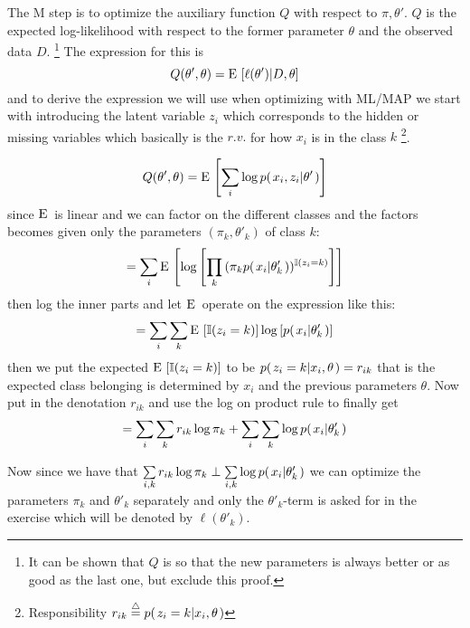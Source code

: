 \documentclass[a4paper,twoside=false,abstract=false,numbers=noenddot,
titlepage=false,headings=small,parskip=half,version=last]{scrartcl}
\begin{document}
\begin{solution}
    The M step is to optimize the auxiliary function $Q$ with respect to
    $\pi,\theta'$. $Q$ is the expected log-likelihood with respect to the former
    parameter $\theta$ and the observed data $D$. 
    \footnote{It can be shown that $Q$ is so that the new parameters is always
    better or as good as the last one, but exclude this proof.}
    The expression for this is
    \begin{equation}
        Q(\theta', \theta) = {\rm E}\,\left[\ell(\theta')|D,\theta\right]
    \end{equation}
    and to derive the expression we will use when optimizing with ML/MAP we start
    with introducing the latent variable $z_i$ which corresponds to the
    hidden or missing
    variables which basically is the $r.v.$ for how $x_i$
    is in the class $k$ \footnote{Responsibility $r_{ik}\eqdef
    \cprob{z_i=k}{x_i,\theta}$}.
    
    \begin{equation}
       Q(\theta', \theta) = 
       {\rm E}\,\left[\sum\limits_i\log p{(\left. x_i,z_i \middle\vert \theta' \right.)}\right] 
    \end{equation}
    since ${\rm E}\,$ is linear and we can factor on the different classes and
    the factors becomes given only the parameters $(\pi_k,\theta'_k)$ of class $k$:
    \begin{equation}
       =\sum\limits_i{\rm E}\, \left[ 
            \log\left[
                \prod\limits_k{(
                    \pi_kp{(\left. x_i \middle\vert \theta'_k \right.)}
                )^{\mathbb{I}(z_i=k)}} 
            \right]
        \right] 
    \end{equation}
    then log the inner parts and let ${\rm E}\,$ operate on the expression like
    this:
    \begin{equation}
        =\sum\limits_i\sum\limits_k{\rm E}\,
            \left[
                \mathbb{I}(z_i=k)
            \right]
            \log\left[
                p{(\left. x_i \middle\vert \theta'_k \right.)}
            \right]
    \end{equation}
    then we put the expected ${\rm E}\,\left[\mathbb{I}(z_i=k)\right]$ to be
    $p{(\left. z_i=k \middle\vert x_i,\theta \right.)}=r_{ik}$ that is the expected class belonging is
    determined by $x_i$ and the previous parameters $\theta$.
    Now put in the denotation $r_{ik}$ and use the log on product rule to
    finally get
    \begin{equation}
        = \sum\limits_i \sum\limits_k {r_{ik}\log \pi_k} +
        \sum\limits_i \sum\limits_k \log p{(\left. x_i \middle\vert \theta'_k \right.)}
    \end{equation}
    
    Now since we have that $\sum\limits_{i,k}r_{ik}\log\pi_k \perp
    \sum\limits_{i,k}\log p{(\left. x_i \middle\vert \theta'_k \right.)}$ we can optimize the parameters
    $\pi_k$ and $\theta'_k$ separately and only the $\theta'_k$-term is asked for in the
    exercise which will be denoted by $\ell(\theta'_k)$.


\end{solution}

\end{document}
